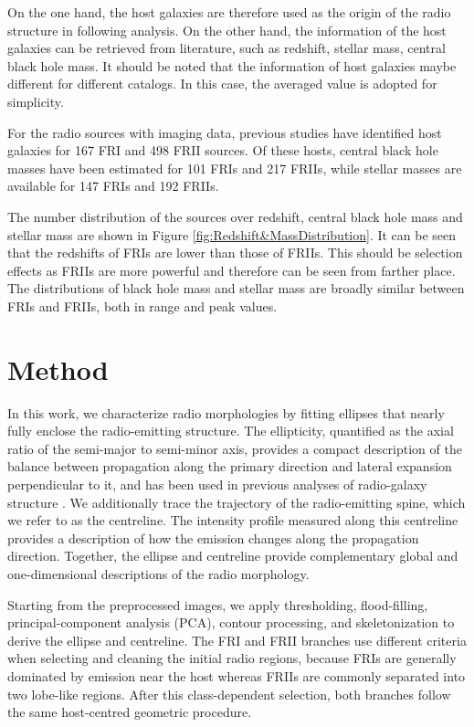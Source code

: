 \documentclass{aa}
\begin{document}
On  the one hand, the host galaxies are therefore used as the origin of the radio structure in following analysis.
On the other hand,  the information of the host galaxies can be retrieved from literature, such as redshift, stellar mass, central black hole mass.  It should be noted that the information of host galaxies maybe different for different catalogs. In this case, the averaged value is adopted for simplicity. 

For the radio sources with imaging data, previous studies have identified host galaxies for 167 FRI and 498 FRII sources. Of these hosts, central black hole masses have been estimated for 101 FRIs and 217 FRIIs, while stellar masses are available for 147 FRIs and 192 FRIIs.

The number distribution of the sources over redshift, central black hole mass and stellar mass are shown in Figure \ref{fig:Redshift&MassDistribution}. 
It can be seen that the redshifts of FRIs are lower than those of FRIIs. This should be selection effects as FRIIs are more powerful and therefore can be seen from farther place.
The distributions of black hole mass and stellar mass are broadly similar between FRIs and FRIIs, both in range and peak values.



\section{Method}\label{sec:Method}

In this work, we characterize radio morphologies by fitting ellipses that nearly fully enclose the radio-emitting structure. The ellipticity, quantified as the axial ratio of the semi-major to semi-minor axis, provides a compact description of the balance between propagation along the primary direction and lateral expansion perpendicular to it, and has been used in previous analyses of radio-galaxy structure \citep[e.g.,][]{lin_new_2024, carilli_cygnus_1996, begelman_overpressured_1989}. We additionally trace the trajectory of the radio-emitting spine, which we refer to as the centreline. The intensity profile measured along this centreline provides a description of how the emission changes along the propagation direction. Together, the ellipse and centreline provide complementary global and one-dimensional descriptions of the radio morphology.

Starting from the preprocessed images, we apply thresholding, flood-filling, principal-component analysis (PCA), contour processing, and skeletonization to derive the ellipse and centreline. The FRI and FRII branches use different criteria when selecting and cleaning the initial radio regions, because FRIs are generally dominated by emission near the host whereas FRIIs are commonly separated into two lobe-like regions. After this class-dependent selection, both branches follow the same host-centred geometric procedure.
\end{document}
